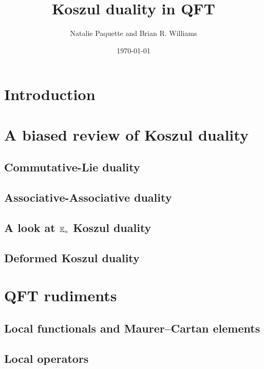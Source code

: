 \documentclass[11pt]{amsart}
\author{Natalie Paquette and Brian R. Williams}
\date{\today}
\title{Koszul duality in QFT}
\begin{document}
\maketitle


\section{Introduction}

\section{A biased review of Koszul duality} 


\subsection{Commutative-Lie duality}


\subsection{Associative-Associative duality} 


\subsection{A look at $\mathbb E_n$ Koszul duality}

\subsection{Deformed Koszul duality}

\section{QFT rudiments}

\subsection{Local functionals and Maurer--Cartan elements} 



\subsection{Local operators}
\end{document}
